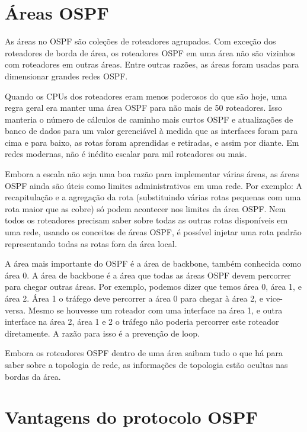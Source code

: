 \documentclass[12pt,a4paper]{report}
\begin{document}
\section{\'Areas OSPF}

As \'areas no OSPF s\~ao cole\c{c}\~oes de roteadores agrupados. Com exce\c{c}\~ao dos roteadores de borda de \'area, os roteadores OSPF em uma \'area n\~ao s\~ao vizinhos com roteadores em outras \'areas. Entre outras raz\~oes, as \'areas foram usadas para dimensionar grandes redes OSPF. 

Quando os CPUs dos roteadores eram menos poderosos do que s\~ao hoje, uma regra geral era manter uma \'area OSPF para n\~ao mais de 50 roteadores. Isso manteria o n\'umero de c\'alculos de caminho mais curtos OSPF e atualiza\c{c}\~oes de banco de dados para um valor gerenci\'avel \`a medida que as interfaces foram para cima e para baixo, as rotas foram aprendidas e retiradas, e assim por diante. Em redes modernas, n\~ao \'e in\'edito escalar para mil roteadores ou mais.

Embora a escala n\~ao seja uma boa raz\~ao para implementar v\'arias \'areas, as \'areas OSPF ainda s\~ao \'uteis como limites administrativos em uma rede. Por exemplo: A recapitula\c{c}\~ao e a agrega\c{c}\~ao da rota (substituindo v\'arias rotas pequenas com uma rota maior que as cobre) s\'o podem acontecer nos limites da \'area OSPF. Nem todos os roteadores precisam saber sobre todas as outras rotas dispon\'iveis em uma rede, usando os conceitos de \'areas OSPF, \'e poss\'ivel injetar uma rota padr\~ao representando todas as rotas fora da \'area local.

A \'area mais importante do OSPF \'e a \'area de backbone, tamb\'em conhecida como \'area 0. A área de backbone \'e a \'area que todas as \'areas OSPF devem percorrer para chegar outras \'areas. Por exemplo, podemos dizer que temos \'area 0, \'area 1, e \'area 2. \'Area 1 o tr\'afego deve percorrer a \'area 0 para chegar \`a \'area 2, e vice-versa. Mesmo se houvesse um roteador com uma interface na \'area 1, e outra interface na \'area 2, \'area 1 e 2 o tr\'afego n\~ao poderia percorrer este roteador diretamente. A raz\~ao para isso \'e a preven\c{c}\~ao de loop.

Embora os roteadores OSPF dentro de uma \'area saibam tudo o que h\'a para saber sobre a topologia de rede, as informa\c{c}\~oes de topologia est\~ao ocultas nas bordas da \'area.

\section{Vantagens do protocolo OSPF}
\end{document}
